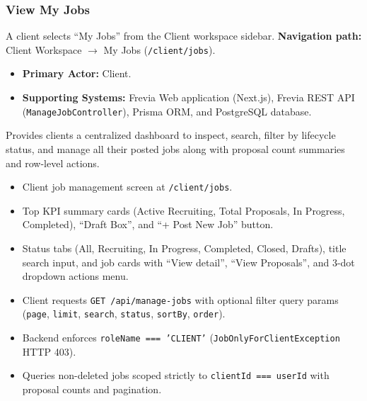 \subsubsection{View My Jobs}

A client selects ``My Jobs'' from the Client workspace sidebar.\newline
\textbf{Navigation path:} Client Workspace $\rightarrow$ My Jobs (\texttt{/client/jobs}).


\begin{itemize}[leftmargin=1.6em,topsep=3pt,itemsep=2pt,parsep=0pt,label=$\bullet$]
    \item \textbf{Primary Actor:} Client.
    \item \textbf{Supporting Systems:} Frevia Web application (Next.js), Frevia REST API (\texttt{ManageJobController}), Prisma ORM, and PostgreSQL database.
\end{itemize}

\noindent Provides clients a centralized dashboard to inspect, search, filter by lifecycle status, and manage all their posted jobs along with proposal count summaries and row-level actions.

\begin{itemize}[leftmargin=1.6em,topsep=3pt,itemsep=2pt,parsep=0pt,label=$\bullet$]
    \item Client job management screen at \texttt{/client/jobs}.
    \item Top KPI summary cards (Active Recruiting, Total Proposals, In Progress, Completed), ``Draft Box'', and ``+ Post New Job'' button.
    \item Status tabs (All, Recruiting, In Progress, Completed, Closed, Drafts), title search input, and job cards with ``View detail'', ``View Proposals'', and 3-dot dropdown actions menu.
\end{itemize}

\begin{itemize}[leftmargin=1.6em,topsep=3pt,itemsep=2pt,parsep=0pt,label=$\bullet$]
    \item Client requests \texttt{GET /api/manage-jobs} with optional filter query params (\texttt{page}, \texttt{limit}, \texttt{search}, \texttt{status}, \texttt{sortBy}, \texttt{order}).
    \item Backend enforces \texttt{roleName === 'CLIENT'} (\texttt{JobOnlyForClientException} HTTP 403).
    \item Queries non-deleted jobs scoped strictly to \texttt{clientId === userId} with proposal counts and pagination.
\end{itemize}

